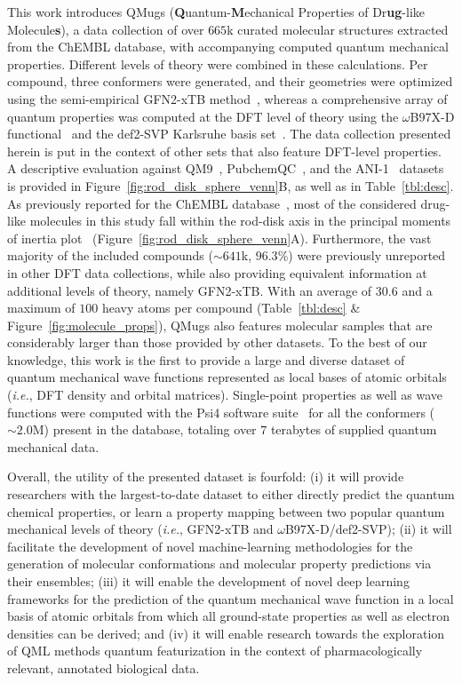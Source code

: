 This work introduces QMugs (\textbf{Q}uantum-\textbf{M}echanical Properties of Dr\textbf{ug}-like Molecule\textbf{s}), a data collection of over $665$k curated molecular structures extracted from the ChEMBL database, with accompanying computed quantum mechanical properties. Different levels of theory were combined in these calculations. Per compound, three conformers were generated, and their geometries were optimized using the semi-empirical GFN2-xTB method~\cite{grimme2017robust, bannwarth2019gfn2, pracht2019robust, grimme2019exploration, bannwarth2020extended}, whereas a comprehensive array of quantum properties was computed at the DFT level of theory using the $\omega$B97X-D functional~\cite{chai2008long} and the def2-SVP Karlsruhe basis set~\cite{weigend2005balanced}. The data collection presented herein is put in the context of other sets that also feature DFT-level properties. A descriptive evaluation against QM9~\cite{ramakrishnan2014quantum}, PubchemQC~\cite{nakata2017pubchemqc}, and the ANI-1~\cite{smith2017anid} datasets is provided in Figure~\ref{fig:rod_disk_sphere_venn}B, as well as in Table~\ref{tbl:desc}. As previously reported for the ChEMBL database~\cite{meyers2016origins}, most of the considered drug-like molecules in this study fall within the rod-disk axis in the principal moments of inertia plot~\cite{sauer2003molecular} (Figure~\ref{fig:rod_disk_sphere_venn}A). Furthermore, the vast majority of the included compounds ($\sim 641$k, $96.3\%$) were previously unreported in other DFT data collections, while also providing equivalent information at additional levels of theory, namely GFN2-xTB. With an average of $30.6$ and a maximum of $100$ heavy atoms per compound (Table~\ref{tbl:desc} \& Figure~\ref{fig:molecule_props}), QMugs also features molecular samples that are considerably larger than those provided by other datasets. To the best of our knowledge, this work is the first to provide a large and diverse dataset of quantum mechanical wave functions represented as local bases of atomic orbitals (\textit{i.e.}, DFT density and orbital matrices). Single-point properties as well as wave functions were computed with the Psi4 software suite~\cite{smith2020psi4} for all the conformers ($\sim 2.0$M) present in the database, totaling over $7$ terabytes of supplied quantum mechanical data.

Overall, the utility of the presented dataset is fourfold: (i) it will provide researchers with the largest-to-date dataset to either directly predict the quantum chemical properties, or learn a property mapping between two popular quantum mechanical levels of theory (\textit{i.e.}, GFN2-xTB and $\omega$B97X-D/def2-SVP); (ii) it will facilitate the development of novel machine-learning methodologies for the generation of molecular conformations and molecular property predictions via their ensembles; (iii) it will enable the development of novel deep learning frameworks for the prediction of the quantum mechanical wave function in a local basis of atomic orbitals from which all ground-state properties as well as electron densities can be derived; and (iv) it will enable research towards the exploration of QML methods quantum featurization in the context of pharmacologically relevant, annotated biological data.

